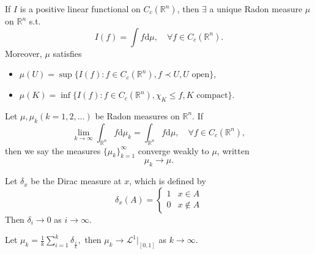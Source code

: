     \begin{proposition}
    If $I$ is a positive linear functional on $C_{c}(\mathbb{R}^{n})$, then $\exists$ a unique Radon measure $\mu$ on $\mathbb{R}^{n}$ s.t.
        \begin{equation*}
            I(f)=\int f\mathrm{d}\mu,\quad \forall f \in C_{c}(\mathbb{R}^{n}).
        \end{equation*}
    Moreover, $\mu$ satisfies
    \begin{itemize}
        \item[(i)] $\mu(U)=\sup\{ I(f):f\in C_{c}(\mathbb{R}^{n}),f \prec U,U\text{ open} \}$,
        \item[(ii)] $\mu(K)=\inf \{ I(f):f \in C_{c}(\mathbb{R}^{n}), \chi _{K}\leq f,K\text{ compact}\}$.
    \end{itemize}
    \label{prop:riesz}
    \end{proposition}

    \begin{definition}
    Let $\mu,\mu _{k}(k=1,2,\dots)$ be Radon measures on $\mathbb{R}^{n}$. If
        \begin{equation*}
            \lim_{ k \to \infty } \int _{\mathbb{R}^{n}}f \mathrm{d}\mu _{k}=\int _{\mathbb{R}^{n}}f\mathrm{d}\mu,\quad\forall f \in C_{c}(\mathbb{R}^{n}),
        \end{equation*}
    then we say the measures $\{ \mu _{k} \}_{k={1}}^{\infty}$ converge weakly to $\mu$, written
        \begin{equation*}
            \mu _{k}\to \mu.
        \end{equation*}
    \end{definition}

    \begin{example}
    Let $\delta _{x}$ be the Dirac measure at $x$, which is defined by
        \begin{equation*}
            \delta _{x}(A)=\begin{cases}
            1 & x \in A \\
            0 & x \notin A
            \end{cases}
        \end{equation*}
    Then $\delta _{i}\to 0$ as $i \to \infty$.
    \end{example}

    \begin{example}
    Let $\mu _{k}=\frac{1}{k}\sum _{i=1}^{k}\delta _{\frac{i}{k}},$ then $\mu _{k}\to \mathcal{L}^{1}|_{[0,1]}$ as $k\to \infty$.
    \end{example}

